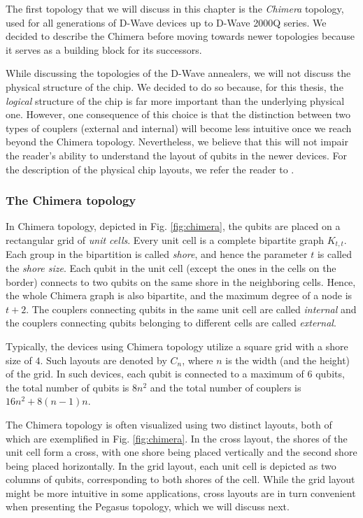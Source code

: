 The first topology that we will discuss in this chapter is the \emph{Chimera}
topology, used for all generations of D-Wave devices up to D-Wave 2000Q series.
We decided to describe the Chimera before moving towards newer topologies
because it serves as a building block for its successors.

While discussing the topologies of the D-Wave annealers, we will not discuss
the physical structure of the chip. We decided to do so because, for this
thesis, the \emph{logical} structure of the chip is far more important than the
underlying physical one. However, one consequence of this choice is that the
distinction between two types of couplers (external and internal) will become
less intuitive once we reach beyond the Chimera topology. Nevertheless, we
believe that this will not impair the reader's ability to understand the layout
of qubits in the newer devices. For the description of the physical chip
layouts, we refer the reader to \cite{dwavedocs}.

\subsubsection{The Chimera topology}

In Chimera topology, depicted in Fig. \ref{fig:chimera}, the qubits are placed
on a rectangular grid of \emph{unit cells}. Every unit cell is a complete
bipartite graph $K_{t,t}$. Each group in the bipartition is called
\emph{shore}, and hence the parameter $t$ is called the \emph{shore size}. Each
qubit in the unit cell (except the ones in the cells on the border) connects to
two qubits on the same shore in the neighboring cells. Hence, the whole Chimera
graph is also bipartite, and the maximum degree of a node is $t+2$. The
couplers connecting qubits in the same unit cell are called \emph{internal} and
the couplers connecting qubits belonging to different cells are called
\emph{external}.

Typically, the devices using Chimera topology utilize a square grid with a
shore size of $4$. Such layouts are denoted by $C_n$, where $n$ is the width
(and the height) of the grid. In such devices, each qubit is connected to a
maximum of 6 qubits, the total number of qubits is $8n^2$ and the total number
of couplers is $16n^2 + 8(n-1)n$.

The Chimera topology is often visualized using two distinct layouts, both of
which are exemplified in Fig. \ref{fig:chimera}. In the cross layout, the
shores of the unit cell form a cross, with one shore being placed vertically
and the second shore being placed horizontally. In the grid layout, each unit
cell is depicted as two columns of qubits, corresponding to both shores of the
cell. While the grid layout might be more intuitive in some applications, cross
layouts are in turn convenient when presenting the Pegasus topology, which we
will discuss next.

